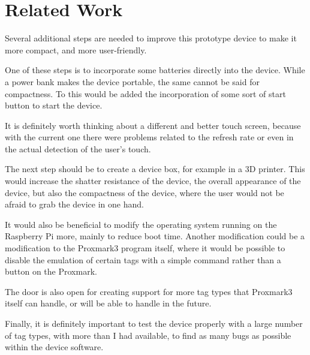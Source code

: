 \chapter{Related Work}

Several additional steps are needed to improve this prototype device to make it more compact, and more user-friendly.

One of these steps is to incorporate some batteries directly into the device. While a power bank makes the device portable, the same cannot be said for compactness. To this would be added the incorporation of some sort of start button to start the device. 

It is definitely worth thinking about a different and better touch screen, because with the current one there were problems related to the refresh rate or even in the actual detection of the user's touch.

The next step should be to create a device box, for example in a 3D printer. This would increase the shatter resistance of the device, the overall appearance of the device, but also the compactness of the device, where the user would not be afraid to grab the device in one hand.

It would also be beneficial to modify the operating system running on the Raspberry Pi more, mainly to reduce boot time. Another modification could be a modification to the Proxmark3 program itself, where it would be possible to disable the emulation of certain tags with a simple command rather than a button on the Proxmark.

The door is also open for creating support for more tag types that Proxmark3 itself can handle, or will be able to handle in the future.

Finally, it is definitely important to test the device properly with a large number of tag types, with more than I had available, to find as many bugs as possible within the device software.